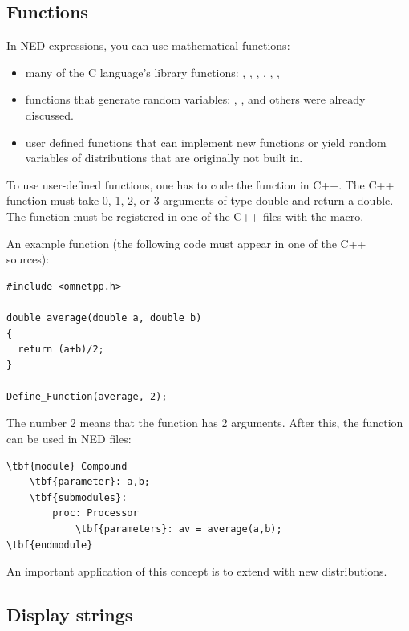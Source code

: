 \subsection{Functions}

In NED expressions, you can use mathematical functions:
\begin{itemize}
  \item{many of the C language's  library functions:
    , , , , ,
    , }
  \item{functions that generate random variables: ,
    ,  and others were already
    discussed.}
  \item{user defined functions that can implement new functions or
    yield random variables of distributions that are originally not
    built in.}
\end{itemize}


To use user-defined functions, one has
to code the function in C++.  The C++ function must take 0, 1, 2, or 3
arguments of type double and return a double. The function must be
registered in one of the C++ files with the 
macro.

An example function (the following code must appear in one of the C++
sources):


\begin{Verbatim}
#include <omnetpp.h>

double average(double a, double b)
{
  return (a+b)/2;
}

Define_Function(average, 2);
\end{Verbatim}


The number 2 means that the  function has 2
arguments.  After this, the  function can be used in
NED files:


\begin{Verbatim}[commandchars=\\\{\}]
\tbf{module} Compound
    \tbf{parameter}: a,b;
    \tbf{submodules}:
        proc: Processor
            \tbf{parameters}: av = average(a,b);
\tbf{endmodule}
\end{Verbatim}


An important application of this concept is to extend {\opp} 
with new distributions.





\subsection{Display strings}
\label{sec:ch-ned-lang:display-strings}

